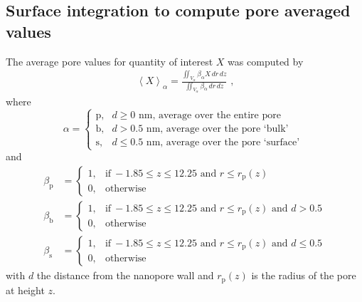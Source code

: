 \documentclass[journal=ancac3, manuscript=suppinfo, etalmode=truncate,maxauthors=0]{achemso}
\begin{document}
\newpage
\subsection{Surface integration to compute pore averaged values}
The average pore values for quantity of interest $X$ was computed by
\begin{align}
  \left< X \right>_{\alpha} =
    \displaystyle\frac{\displaystyle\iint_{V_{\alpha}} \beta_{\alpha} X \,dr\,dz}
                      {\displaystyle\iint_{V_{\alpha}} \beta_{\alpha} \,dr\,dz}
  \text{ ,}
\end{align}
where
\begin{equation}
  \alpha=
  \begin{cases}
    \text{p}, & d \ge 0  \text{~nm} \text{, average over the entire pore} \\
    \text{b}, & d > 0.5  \text{~nm} \text{, average over the pore `bulk' }  \\
    \text{s}, & d \le 0.5\text{~nm} \text{, average over the pore `surface' } 
  \end{cases}
\end{equation}
and
\begin{align}
  \beta_{\text{p}} &=
  \begin{cases}
    1, & \text{if}\ -1.85\le z \le 12.25  \text{ and } r \le r_\text{p}(z) \\
    0, & \text{otherwise}
  \end{cases} \\
  \beta_{\text{b}} &=
  \begin{cases}
  1, & \text{if}\ -1.85\le z \le 12.25  \text{ and } r \le r_\text{p}(z) \text{ and } d > 0.5 \\
  0, & \text{otherwise}
  \end{cases} \\
  \beta_{\text{s}} &=
  \begin{cases}
  1, & \text{if}\ -1.85\le z \le 12.25  \text{ and } r \le r_\text{p}(z) \text{ and } d \le 0.5 \\
  0, & \text{otherwise}
  \end{cases}
\end{align}
with $d$ the distance from the nanopore wall and $r_\text{p}(z)$ is the radius of the pore at height $z$.


\newpage
\end{document}
